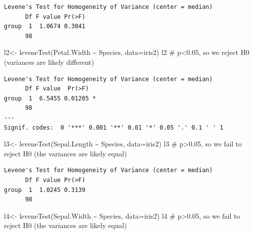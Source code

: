 \documentclass[
  letterpaper,
  DIV=11,
  numbers=noendperiod]{scrartcl}
\newenvironment{Shaded}{\begin{snugshade}}{\end{snugshade}}
\newcommand{\AttributeTok}[1]{\textcolor[rgb]{0.40,0.45,0.13}{#1}}
\newcommand{\CommentTok}[1]{\textcolor[rgb]{0.37,0.37,0.37}{#1}}
\newcommand{\FunctionTok}[1]{\textcolor[rgb]{0.28,0.35,0.67}{#1}}
\newcommand{\NormalTok}[1]{\textcolor[rgb]{0.00,0.23,0.31}{#1}}
\newcommand{\OtherTok}[1]{\textcolor[rgb]{0.00,0.23,0.31}{#1}}
\newcommand{\SpecialCharTok}[1]{\textcolor[rgb]{0.37,0.37,0.37}{#1}}
\begin{document}
\begin{verbatim}
Levene's Test for Homogeneity of Variance (center = median)
      Df F value Pr(>F)
group  1  1.0674 0.3041
      98               
\end{verbatim}

\begin{Shaded}
\begin{Highlighting}[]
\NormalTok{l2}\OtherTok{\textless{}{-}} \FunctionTok{leveneTest}\NormalTok{(Petal.Width }\SpecialCharTok{\textasciitilde{}}\NormalTok{ Species, }\AttributeTok{data=}\NormalTok{iris2)}
\NormalTok{l2 }\CommentTok{\# p\textless{}0.05, so we reject H0 (variances are likely different)}
\end{Highlighting}
\end{Shaded}

\begin{verbatim}
Levene's Test for Homogeneity of Variance (center = median)
      Df F value  Pr(>F)  
group  1  6.5455 0.01205 *
      98                  
---
Signif. codes:  0 '***' 0.001 '**' 0.01 '*' 0.05 '.' 0.1 ' ' 1
\end{verbatim}

\begin{Shaded}
\begin{Highlighting}[]
\NormalTok{l3}\OtherTok{\textless{}{-}} \FunctionTok{leveneTest}\NormalTok{(Sepal.Length }\SpecialCharTok{\textasciitilde{}}\NormalTok{ Species, }\AttributeTok{data=}\NormalTok{iris2)}
\NormalTok{l3 }\CommentTok{\# p\textgreater{}0.05, so we fail to reject H0 (the variances are likely equal)}
\end{Highlighting}
\end{Shaded}

\begin{verbatim}
Levene's Test for Homogeneity of Variance (center = median)
      Df F value Pr(>F)
group  1  1.0245 0.3139
      98               
\end{verbatim}

\begin{Shaded}
\begin{Highlighting}[]
\NormalTok{l4}\OtherTok{\textless{}{-}} \FunctionTok{leveneTest}\NormalTok{(Sepal.Width }\SpecialCharTok{\textasciitilde{}}\NormalTok{ Species, }\AttributeTok{data=}\NormalTok{iris2)}
\NormalTok{l4 }\CommentTok{\# p\textgreater{}0.05, so we fail to reject H0 (the variances are likely equal)}
\end{Highlighting}
\end{Shaded}
\end{document}
